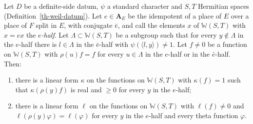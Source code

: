 \begin{lemma}\label{th-invariant-form}
Let $D$ be a definite-side datum, $\psi$ a standard character and $S,T$
Hermitian spaces (Definition~\ref{th-weil-datum}). Let $e\in\mathbf A_E$ be the
idempotent of a place of $E$ over a place of $F$ split in $E$, with conjugate
$\bar e$, and call the elements $x$ of $\mathbb W(S,T)$ with $x=ex$ the
\emph{$e$-half}. Let $\Lambda\subset\mathbb W(S,T)$ be a subgroup such that for
every $y\notin\Lambda$ in the $e$-half there is $l\in\Lambda$ in the $\bar e$-half
with $\psi(\langle l,y\rangle)\neq1$. Let $f\neq0$ be a function on
$\mathbb W(S,T)$ with $\rho(u)f=f$ for every $u\in\Lambda$ in the $e$-half or in
the $\bar e$-half. Then:
\begin{enumerate}
\item there is a linear form $\kappa$ on the functions on $\mathbb W(S,T)$ with
  $\kappa(f)=1$ such that $\kappa(\rho(y)f)$ is real and $\geq0$ for every $y$
  in the $e$-half;
\item there is a linear form $\ell$ on the functions on $\mathbb W(S,T)$ with
  $\ell(f)\neq0$ and $\ell(\rho(y)\varphi)=\ell(\varphi)$ for every $y$ in the
  $e$-half and every theta function $\varphi$.
\end{enumerate}
\end{lemma}

